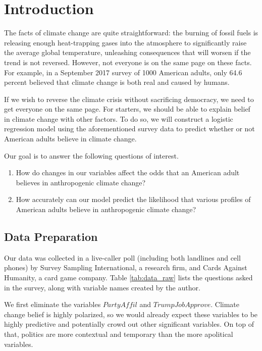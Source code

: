 
\section{Introduction}

\par The facts of climate change are quite straightforward: the burning of fossil fuels is releasing enough heat-trapping gases into the atmosphere to significantly raise the average global temperature, unleashing consequences that will worsen if the trend is not reversed. However, not everyone is on the same page on these facts. For example, in a September 2017 survey of 1000 American adults,\cite{dset} only 64.6 percent believed that climate change is both real and caused by humans.

\par \bigskip If we wish to reverse the climate crisis without sacrificing democracy, we need to get everyone on the same page. For starters, we should be able to explain belief in climate change with other factors. To do so, we will construct a logistic regression model using the aforementioned survey data to predict whether or not American adults believe in climate change.

\par \bigskip Our goal is to answer the following questions of interest.

\begin{enumerate}
    \item How do changes in our variables affect the odds that an American adult believes in anthropogenic climate change?
    \item How accurately can our model predict the likelihood that various profiles of American adults believe in anthropogenic climate change?
\end{enumerate}

\subsection{Data Preparation}

\par Our data was collected in a live-caller poll (including both landlines and cell phones) by Survey Sampling International, a research firm, and Cards Against Humanity, a card game company. Table \ref{tab:data_raw} lists the questions asked in the survey, along with variable names created by the author.

\par \bigskip We first eliminate the variables $PartyAffil$ and $TrumpJobApprove$. Climate change belief is highly polarized, so we would already expect these variables to be highly predictive and potentially crowd out other significant variables. On top of that, politics are more contextual and temporary than the more apolitical variables.


